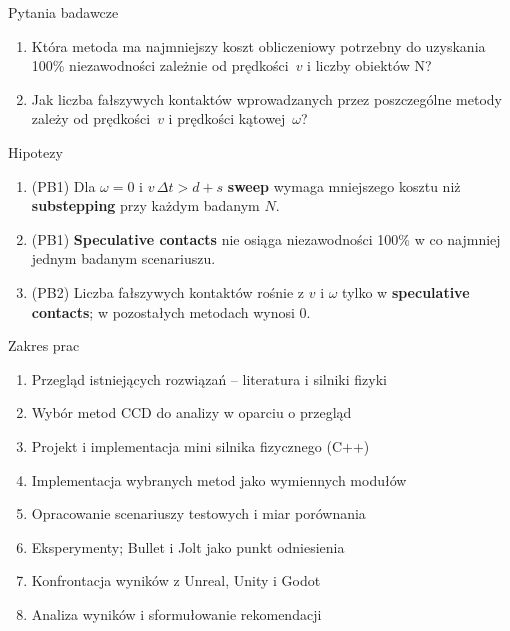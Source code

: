 \documentclass[aspectratio=169, 11pt]{beamer}
\begin{document}
\begin{frame}{Pytania badawcze}
  \Large\setlength{\leftmargini}{2.6em}
  \begin{enumerate}\itemsep0.7em
    \item[\textbf{PB1}] Która metoda ma najmniejszy koszt obliczeniowy potrzebny do uzyskania 100\% niezawodności zależnie od prędkości~$v$ i liczby obiektów N?
    \item[\textbf{PB2}] Jak liczba fałszywych kontaktów wprowadzanych przez poszczególne metody zależy od prędkości~$v$ i prędkości kątowej~$\omega$?
  \end{enumerate}
\end{frame}
 
\begin{frame}{Hipotezy}
  \setlength{\leftmargini}{2.2em}
  \begin{enumerate}\itemsep0.7em
    \item[\textbf{H1}] (PB1) Dla $\omega = 0$ i $v\,\Delta t > d + s$ \textbf{sweep}
      wymaga mniejszego kosztu niż \textbf{substepping} przy każdym badanym $N$.
    \item[\textbf{H2}] (PB1) \textbf{Speculative contacts} nie osiąga niezawodności
      100\% w co najmniej jednym badanym scenariuszu.
    \item[\textbf{H3}] (PB2) Liczba fałszywych kontaktów rośnie z $v$ i $\omega$
      tylko w \textbf{speculative contacts}; w pozostałych metodach wynosi 0.
  \end{enumerate}
  \vfill
  \vspace{0.2cm}
\end{frame}
 
\begin{frame}{Zakres prac}
  \setlength{\leftmargini}{1.6em}
  \begin{enumerate}\itemsep0.2em
    \item Przegląd istniejących rozwiązań -- literatura i silniki fizyki
    \item Wybór metod CCD do analizy w oparciu o przegląd
    \item Projekt i implementacja mini silnika fizycznego (C++)
    \item Implementacja wybranych metod jako wymiennych modułów
    \item Opracowanie scenariuszy testowych i miar porównania
    \item Eksperymenty; Bullet i Jolt jako punkt odniesienia
    \item Konfrontacja wyników z Unreal, Unity i Godot
    \item Analiza wyników i sformułowanie rekomendacji
  \end{enumerate}
\end{frame}
 
\end{document}
